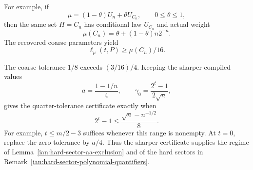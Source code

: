 \begin{remark}
\label{ian:robust-compilation-character-quarter}
For example, if
\[
 \mu=(1-\theta)U_n+\theta U_{C_n},\qquad 0\le\theta\le1,
\]
then the same set \(H=C_n\) has conditional law \(U_{C_n}\) and actual weight
\[
 \mu(C_n)=\theta+(1-\theta)n2^{-n}.
\]
The recovered coarse parameters yield
\[
 \ell_\mu(t,P)\ge\mu(C_n)/16.
\]

The coarse tolerance \(1/8\) exceeds \((3/16)/4\).
Keeping the sharper compiled values
\[
 a=\frac{1-1/n}{4},\qquad
 \gamma_0=\frac{2^t-1}{2\sqrt n},
\]
gives the quarter-tolerance certificate exactly when
\[
 2^t-1\le\frac{\sqrt n-n^{-1/2}}8.
\]
For example, \(t\le m/2-3\) suffices whenever this range is nonempty.
At \(t=0\), replace the zero tolerance by \(a/4\).
Thus the sharper certificate supplies the regime of
Lemma~\ref{ian:hard-sector-aa-exclusion} and of the hard sectors in
Remark~\ref{ian:hard-sector-polynomial-quantifiers}.
\end{remark}
